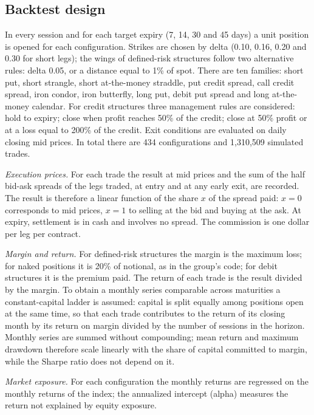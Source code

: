 \documentclass[11pt,a4paper]{article}
\begin{document}
\subsection{Backtest design}

In every session and for each target expiry (7, 14, 30 and 45 days) a unit position is opened for each configuration. Strikes are chosen by delta (0.10, 0.16, 0.20 and 0.30 for short legs); the wings of defined-risk structures follow two alternative rules: delta 0.05, or a distance equal to 1\% of spot. There are ten families: short put, short strangle, short at-the-money straddle, put credit spread, call credit spread, iron condor, iron butterfly, long put, debit put spread and long at-the-money calendar. For credit structures three management rules are considered: hold to expiry; close when profit reaches 50\% of the credit; close at 50\% profit or at a loss equal to 200\% of the credit. Exit conditions are evaluated on daily closing mid prices. In total there are 434 configurations and 1,310,509 simulated trades.

\emph{Execution prices.} For each trade the result at mid prices and the sum of the half bid-ask spreads of the legs traded, at entry and at any early exit, are recorded. The result is therefore a linear function of the share $x$ of the spread paid: $x=0$ corresponds to mid prices, $x=1$ to selling at the bid and buying at the ask. At expiry, settlement is in cash and involves no spread. The commission is one dollar per leg per contract.

\emph{Margin and return.} For defined-risk structures the margin is the maximum loss; for naked positions it is 20\% of notional, as in the group's code; for debit structures it is the premium paid. The return of each trade is the result divided by the margin. To obtain a monthly series comparable across maturities a constant-capital ladder is assumed: capital is split equally among positions open at the same time, so that each trade contributes to the return of its closing month by its return on margin divided by the number of sessions in the horizon. Monthly series are summed without compounding; mean return and maximum drawdown therefore scale linearly with the share of capital committed to margin, while the Sharpe ratio does not depend on it.

\emph{Market exposure.} For each configuration the monthly returns are regressed on the monthly returns of the index; the annualized intercept (alpha) measures the return not explained by equity exposure.
\end{document}
